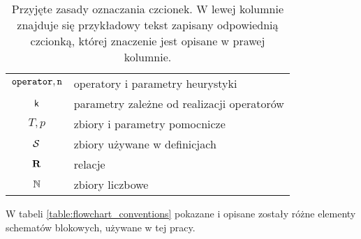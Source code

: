 \documentclass[./FM_mgr.tex]{subfiles}
\begin{document}
\begin{table}[h]
	\caption{Przyjęte zasady oznaczania czcionek. W lewej kolumnie znajduje się przykładowy tekst zapisany odpowiednią czcionką, której znaczenie jest opisane w prawej kolumnie. \label{table:signature_conventions}}
	\centering
	\begin{tabular}{cl}
		$\mathtt{operator}, \mathtt{n}$ & operatory i parametry heurystyki \\
		$\mathsf{k}$ & parametry zależne od realizacji operatorów \\
		$T, p$ & zbiory i parametry pomocnicze \\
		$\mathcal{S}$ & zbiory używane w definicjach \\
		$\mathbf{R}$ & relacje \\
		$\mathbb{N}$ & zbiory liczbowe
	\end{tabular}
\end{table}

W tabeli \ref{table:flowchart_conventions} pokazane i opisane zostały różne elementy schematów blokowych, używane w tej pracy.
%

\end{document}
